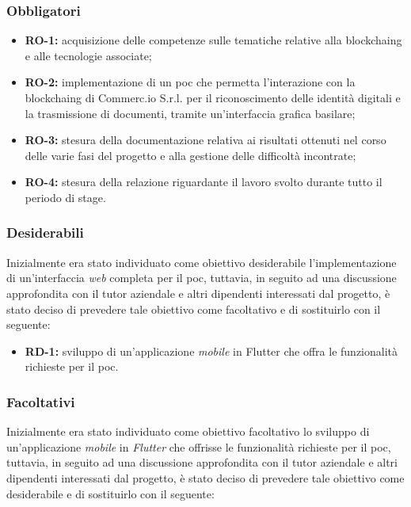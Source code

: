\subsubsection*{Obbligatori}
\begin{itemize}
	\item \textbf{RO-1:} acquisizione delle competenze sulle tematiche relative alla \gls{blockchaing} e alle tecnologie associate;
	\item \textbf{RO-2:} implementazione di un \gls{poc} che permetta l'interazione con la \gls{blockchaing} di Commerc.io S.r.l. per il riconoscimento delle identità digitali e la trasmissione di documenti, tramite un'interfaccia grafica basilare;
	\item \textbf{RO-3:} stesura della documentazione relativa ai risultati ottenuti nel corso delle varie fasi del progetto e alla gestione delle difficoltà incontrate;
	\item \textbf{RO-4:} stesura della relazione riguardante il lavoro svolto durante tutto il periodo di stage.
\end{itemize}

\subsubsection*{Desiderabili}

Inizialmente era stato individuato come obiettivo desiderabile l'implementazione di un'interfaccia \textit{web} completa per il \gls{poc}, tuttavia, in seguito ad una discussione approfondita con il tutor aziendale e altri dipendenti interessati dal progetto, è stato deciso di prevedere tale obiettivo come facoltativo e di sostituirlo con il seguente:

\begin{itemize}
	\item \textbf{RD-1:} sviluppo di un'applicazione \textit{mobile} in Flutter che offra le funzionalità richieste per il \gls{poc}.
\end{itemize}

\subsubsection*{Facoltativi}

Inizialmente era stato individuato come obiettivo facoltativo lo sviluppo di un'applicazione \textit{mobile} in \textit{Flutter} che offrisse le funzionalità richieste per il \gls{poc}, tuttavia, in seguito ad una discussione approfondita con il tutor aziendale e altri dipendenti interessati dal progetto, è stato deciso di prevedere tale obiettivo come desiderabile e di sostituirlo con il seguente:

